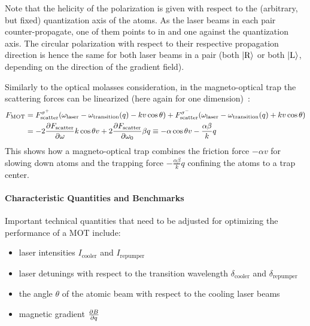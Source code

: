 Note that the helicity of the polarization is given with respect to the (arbitrary, but fixed) quantization axis of the atoms. As the laser beams in each pair counter-propagate, one of them points to in and one against the quantization axis. The circular polarization with respect to their respective propagation direction is hence the same for both laser beams in a pair (both $\Ket{\text{R}}$ or both $\Ket{\text{L}}$, depending on the direction of the gradient field).


Similarly to the optical molasses consideration, in the magneto-optical trap the scattering forces can be linearized  (here again for one dimension)~\cite{foot_atomic_2005}:
\begin{equation}\label{eq:mot_force}
    \begin{split}
        F_\text{MOT} &= F_\text{scatter}^{\sigma^+}(\omega_\text{laser} - \omega_\text{transition}(q) - kv \cos \theta) + F_\text{scatter}^{\sigma^-}(\omega_\text{laser} - \omega_\text{transition}(q) + kv \cos \theta)\\
        &= -2 \pdv{F_\text{scatter}}{\omega} k\cos \theta v + 2 \pdv{F_\text{scatter}}{\omega_0} \beta q  \equiv - \alpha \cos \theta v - \frac{\alpha \beta}{k} q
    \end{split}
\end{equation}
This shows how a magneto-optical trap combines the friction force $- \alpha v$ for slowing down atoms and the trapping force $- \frac{\alpha \beta}{k} q$ confining the atoms to a trap center.


\paragraph{Characteristic Quantities and Benchmarks}
Important technical quantities that need to be adjusted for optimizing the performance of a MOT include:
\begin{itemize}
    \item laser intensities $I_\text{cooler}$ and $I_\text{repumper}$
    \item laser detunings with respect to the transition wavelength $\delta_\text{cooler}$ and $\delta_\text{repumper}$
    \item the angle $\theta$ of the atomic beam with respect to the cooling laser beams
    \item magnetic gradient $\pdv{B}{q}$
\end{itemize}

